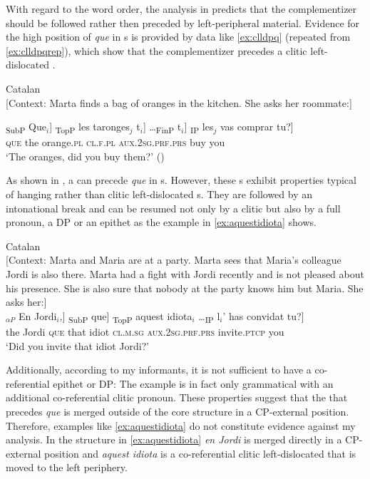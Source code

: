 With regard to the word order, the analysis  in  predicts that the complementizer should be followed rather then preceded by left-peripheral material. Evidence for the high position of \emph{que} in s is provided by data like \eqref{ex:clldpq} (repeated from \eqref{ex:clldpqrep}), which show that the complementizer precedes a  clitic left-dislocated . 

\ea \label{ex:clldpq} Catalan\\ {[Context: Marta finds a bag of oranges in the kitchen. She asks her roommate:]}\\
	\exi{} 
	
	\gll {\ob}\textsubscript{SubP} Que$_i$] {\ob}\textsubscript{TopP} les taronges$_j$ t$_i$]  \dots {\ob}\textsubscript{FinP} t$_i$] {\ob}\textsubscript{IP} les$_j$ vas comprar tu?] \\
	{} \textsc{que} {} the orange.\textsc{pl} {} {} {}{} {} \textsc{cl.f.pl} \textsc{aux.2sg.prf.prs} buy you {}{}{}\\
	\glt `The oranges, did you buy them?' (\citealt[49: ex 98a]{Kocher2017a})
\z

As shown in , a  can precede \emph{que} in s. However, these s exhibit properties typical of hanging rather than  clitic left-dislocated s. They are followed by an intonational break and can be resumed not only by a clitic but also by a full pronoun, a DP or an  epithet as the example in \eqref{ex:aquestidiota} shows. 

\ea \label{ex:aquestidiota} 		Catalan\\
 {[Context: Marta and Maria are at a party. Marta sees that Maria's  colleague Jordi is also there. Marta had a fight with Jordi recently and is not pleased about his presence. She is also sure that nobody at the party knows him but Maria. She asks her:]}\\
		\exi{} 
	\gll  {\ob}$_{\alpha P}$ En Jordi$_i$,] {\ob}\textsubscript{SubP} que]  {\ob}\textsubscript{TopP} aquest idiota$_i$ \dots  {\ob}\textsubscript{IP} l$_i$' has convidat tu?] \\
	{} the Jordi  {} \textsc{que} {}   that idiot {}  \textsc{cl.m.sg} \textsc{aux.2sg.prf.prs} invite.\textsc{ptcp} you \\
	\glt `Did you invite that idiot Jordi?'
\z

Additionally, according to my informants, it is not sufficient  to have a co-referential epithet or DP: The example is in fact only grammatical with an  additional co-referential clitic pronoun.  These properties suggest that the    that precedes \emph{que} is merged outside of the core structure in a CP-external position. Therefore, examples like \eqref{ex:aquestidiota} do not constitute evidence against my  analysis. In the structure in \eqref{ex:aquestidiota}  \emph{en Jordi} is merged  directly  in a CP-external position and  \emph{aquest idiota} is a co-referential clitic left-dislocated  that is moved to the left periphery.

